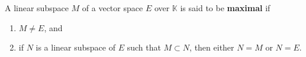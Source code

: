 A linear subspace $M$ of a vector space $E$ over $\mathbb{K}$ is said to be \textbf{maximal} if
\begin{enumerate}
\item[(i)] $M \neq E$, and
\item[(ii)] if $N$ is a linear subspace of $E$ such that $M \subset N$, then either $N = M$ or $N = E$.
\end{enumerate}
